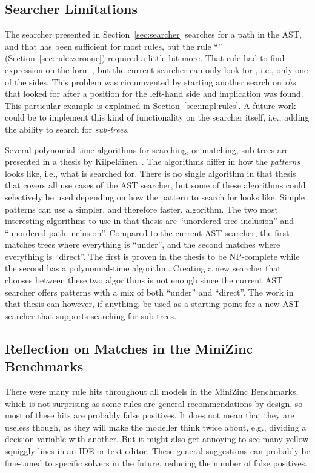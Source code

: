 \documentclass[a4paper,12pt]{article}
\newcommand{\ruleref}[1]{``\nameref{sec:rule:#1}'' (Section~\ref{sec:rule:#1})}
\begin{document}
\subsection{Searcher Limitations}
The searcher presented in Section~\ref{sec:searcher} searches for a path in the AST, and
that has been sufficient for most rules, but the rule \ruleref{zeroone} required a little
bit more. That rule had to find expression on the form , but the current
searcher can only look for , i.e., only one of the sides. This problem was
circumvented by starting another search on \textit{rhs} that looked for  after a
position for the left-hand side and implication was found. This particular example is
explained in Section~\ref{sec:impl:rules}. A future work could be to implement this kind
of functionality on the searcher itself, i.e., adding the ability to search for
\emph{sub-trees}.

Several polynomial-time algorithms for searching, or matching, sub-trees are presented in
a thesis by Kilpeläinen~\cite{kilpelainen92}. %
The algorithms differ in how the \emph{patterns} looks like, i.e., what is searched for.
There is no single algorithm in that thesis that covers all use cases of the AST searcher,
but some of these algorithms could selectively be used depending on how the pattern to
search for looks like. Simple patterns can use a simpler, and therefore faster, algorithm.
The two most interesting algorithms to use in that thesis are ``unordered tree inclusion''
and ``unordered path inclusion''. Compared to the current AST searcher, the first matches
trees where everything is ``under'', and the second matches where everything is
``direct''. The first is proven in the thesis to be NP-complete while the second has a
polynomial-time algorithm. Creating a new searcher that chooses between these two
algorithms is not enough since the current AST searcher offers patterns with a mix of
both ``under'' and ``direct''. The work in that thesis can however, if anything, be used as a
starting point for a new AST searcher that supports searching for sub-trees.

\subsection{Reflection on Matches in the MiniZinc Benchmarks}
There were many rule hits throughout all models in the MiniZinc Benchmarks, which is not
surprising as some rules are general recommendations by design, so most of these hits are
probably false positives. It does not mean that they are useless though, as they will make
the modeller think twice about, e.g., dividing a decision variable with another. But it
might also get annoying to see many yellow squiggly lines in an IDE or text editor. These
general suggestions can probably be fine-tuned to specific solvers in the future, reducing
the number of false positives.
\end{document}
